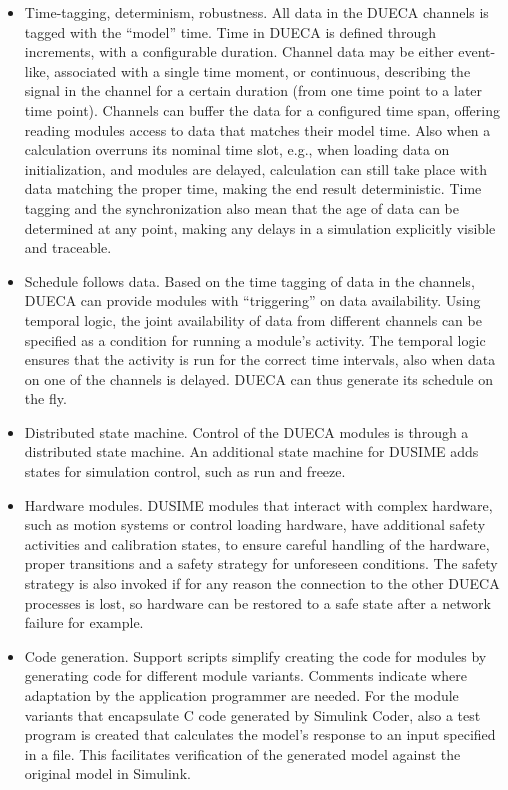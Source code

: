 \documentclass[11pt,a4paper,twoside]{scrartcl}
\begin{document}
\begin{itemize}
\item Time-tagging, determinism, robustness. All data in the DUECA channels is tagged with the ``model'' time. Time in DUECA is defined through increments, with a configurable duration. Channel data may be either event-like, associated with a single time moment, or continuous, describing the signal in the channel for a certain duration (from one time point to a later time point). Channels can buffer the data for a configured time span, offering reading modules access to data that matches their model time. Also when a calculation overruns its nominal time slot, e.g., when loading data on initialization, and modules are delayed, calculation can still take place with data matching the proper time, making the end result deterministic. Time tagging and the synchronization also mean that the age of data can be determined at any point, making any delays in a simulation explicitly visible and traceable.
\item Schedule follows data. Based on the time tagging of data in the channels, DUECA can provide modules with ``triggering'' on data availability. Using temporal logic, the joint availability of data from different channels can be specified as a condition for running a module's activity. The temporal logic ensures that the activity is run for the correct time intervals, also when data on one of the channels is delayed. DUECA can thus generate its schedule on the fly.
\item Distributed state machine. Control of the DUECA modules is through a distributed state machine. An additional state machine for DUSIME adds states for simulation control, such as run and freeze.
\item Hardware modules. DUSIME modules that interact with complex hardware, such as motion systems or control loading hardware, have additional safety activities and calibration states, to ensure careful handling of the hardware, proper transitions and a safety strategy for unforeseen conditions. The safety strategy is also invoked if for any reason the connection to the other DUECA processes is lost, so hardware can be restored to a safe state after a network failure for example.
\item Code generation. Support scripts simplify creating the code for modules by generating code for different module variants. Comments indicate where adaptation by the application programmer are needed. For the module variants that encapsulate C code generated by Simulink Coder, also a test program is created that calculates the model's response to an input specified in a file. This facilitates verification of the generated model against the original model in Simulink.

\end{itemize}
\end{document}

